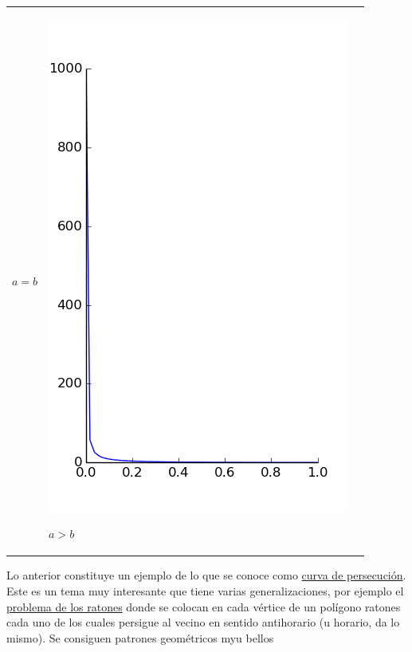 \begin{tabular}{m{4cm} m{4cm} m{4cm}}
\begin{center}
$a=b$
\end{center}
&
\begin{center}
\includegraphics[scale=.3]{imagenes/perse_a_2_b_1.png}

$a>b$
\end{center}

\end{tabular}



Lo anterior constituye un ejemplo de lo que se conoce como \href{https://en.wikipedia.org/wiki/Pursuit_curve}{curva de persecución}. Este es un tema muy interesante que tiene varias generalizaciones, por ejemplo el \href{https://en.wikipedia.org/wiki/Mice_problem}{problema de los ratones} donde se colocan en cada vértice de un polígono ratones cada uno de los cuales persigue al vecino en sentido antihorario (u horario, da lo mismo). Se consiguen patrones geométricos myu bellos




